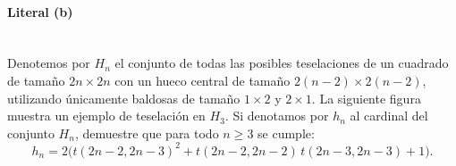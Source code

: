 \paragraph{Literal (b)}\mbox{}\\
Denotemos por \(H_n\) el conjunto de todas las posibles teselaciones de un cuadrado de tamaño \(2n\times2n\) con un hueco central de tamaño \(2(n-2)\times2(n-2)\), utilizando únicamente baldosas de tamaño \(1\times2\) y \(2\times1\). La siguiente figura muestra un ejemplo de teselación en \(H_3\). Si denotamos por \(h_n\) al cardinal del conjunto \(H_n\), demuestre que para todo \(n\ge3\) se cumple:
\[
h_n = 2\bigl(t(2n-2,2n-3)^2 + t(2n-2,2n-2)\,t(2n-3,2n-3) + 1\bigr).
\]